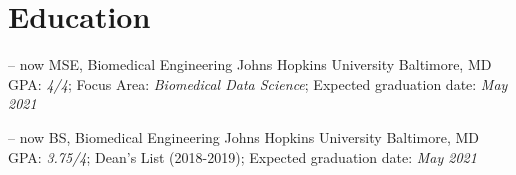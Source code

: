 \section{Education}

\cventry
{-- now}
{MSE, Biomedical Engineering}
{Johns Hopkins University}
{Baltimore, MD}
{}
{
GPA: \textit{4/4}; 
Focus Area: \textit{Biomedical Data Science}; 
Expected graduation date: \textit{May 2021}
}

\cventry
{-- now}
{BS, Biomedical Engineering}
{Johns Hopkins University}
{Baltimore, MD}
{}
{
GPA: \textit{3.75/4}; 
Dean's List (2018-2019);
{Expected graduation date:} \textit{May 2021}
}
